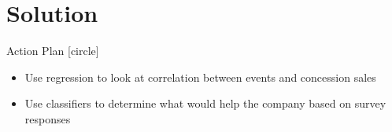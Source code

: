 \documentclass[compress,blue]{beamer}
\begin{document}
\section{Solution}

\begin{frame}{Action Plan}
[circle]
\begin{itemize}
  \item Use regression to look at correlation between events and concession
  sales
  \item Use classifiers to determine what would help the company based on survey
  responses
\end{itemize}
\end{frame}
\end{document}
